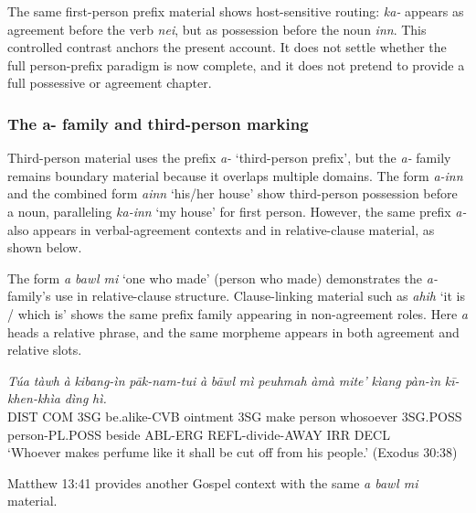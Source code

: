 \documentclass[
  11pt,
  a4paper,
]{article}
\newcommand{\tdim}[1]{\textit{#1}}
\newcommand{\tdimword}[1]{\textit{#1}}
\renewcommand{\textsc}[1]{{\footnotesize\MakeUppercase{#1}}}
\newcommand{\glossquote}[1]{`#1'}
\begin{document}
The same first-person prefix material shows host-sensitive routing:
\tdim{ka-} appears as agreement before the verb \tdim{nei}, but as
possession before the noun \tdim{inn}. This controlled contrast anchors
the present account. It does not settle whether the full person-prefix
paradigm is now complete, and it does not pretend to provide a full
possessive or agreement chapter.

\subsubsection{The a- family and third-person
marking}\label{the-a--family-and-third-person-marking}

Third-person material uses the prefix \tdim{a-}
\glossquote{third-person prefix}, but the \tdim{a-} family remains
boundary material because it overlaps multiple domains. The form
\tdim{a-inn} and the combined form \tdim{ainn}
\glossquote{his/her house} show third-person possession before a noun,
paralleling \tdim{ka-inn} \glossquote{my house} for first person.
However, the same prefix \tdim{a-} also appears in verbal-agreement
contexts and in relative-clause material, as shown below.

The form \tdim{a bawl mi} \glossquote{one who made} (person who made)
demonstrates the \tdim{a-} family's use in relative-clause structure.
Clause-linking material such as \tdim{ahih}
\glossquote{it is / which is} shows the same prefix family appearing in
non-agreement roles. Here \tdim{a} heads a relative phrase, and the same
morpheme appears in both agreement and relative slots.

\begin{exe}
\ex \label{ex:pref-abawlmi-exod30}
\gll \tdimword{Túa} \tdimword{tàwh} \tdimword{à} \tdimword{kibang-ìn} \tdimword{pāk-nam-tui} \tdimword{à} \tdimword{bāwl} \tdimword{mì} \tdimword{peuhmah} \tdimword{àmà} \tdimword{mite'} \tdimword{kìang} \tdimword{pàn-ìn} \tdimword{kī-khen-khìa} \tdimword{dìng} \tdimword{hì.} \\
     \textsc{dist} \textsc{com} \textsc{3sg} be.alike-\textsc{cvb} ointment \textsc{3sg} make person whosoever \textsc{3sg}.\textsc{poss} person-\textsc{pl}.\textsc{poss} beside \textsc{abl}-\textsc{erg} \textsc{refl}-divide-\textsc{away} \textsc{irr} \textsc{decl} \\
\glt \glossquote{Whoever makes perfume like it shall be cut off from his people.} (Exodus 30:38)
\end{exe}

Matthew 13:41 provides another Gospel context with the same
\tdim{a bawl mi} material.
\end{document}
